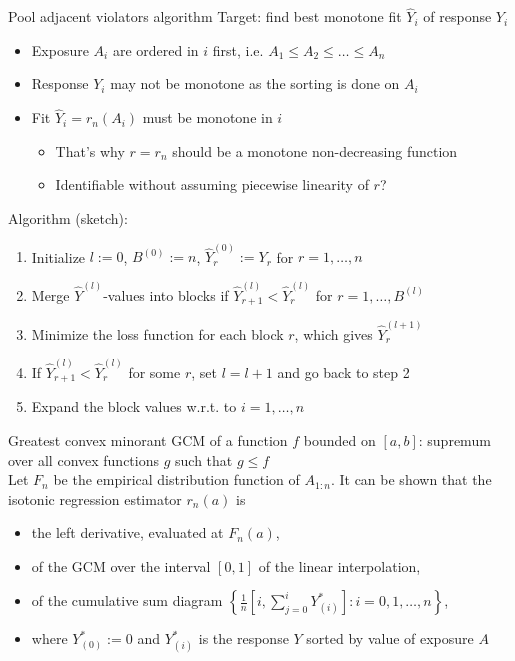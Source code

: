 \documentclass{beamer}
\newcommand{\f}[2]{\frac{#1}{#2}}
\newcommand{\vs}[1]{\vspace{#1 cm}}
\begin{document}
\begin{frame}{Pool adjacent violators algorithm}
  Target: find best monotone fit $\hat{Y}_i$ of response $Y_i$
  \begin{itemize}
    \item Exposure $A_i$ are ordered in $i$ first, i.e. $A_1 \le A_2 \le \dots \le A_n$
    \item Response $Y_i$ may not be monotone as the sorting is done on $A_i$
    \item Fit $\hat{Y}_i = r_n(A_i)$ must be monotone in $i$
    \begin{itemize}
      \item That's why $r=r_n$ should be a monotone non-decreasing function
      \item Identifiable without assuming piecewise linearity of $r$?
    \end{itemize}
  \end{itemize}
  Algorithm (sketch):
  \begin{enumerate}
    \item Initialize $l:=0$, $B^{(0)}:=n$, $\hat{Y}_r^{(0)} := Y_r$ for $r=1, \dots, n$
    \item Merge $\hat{Y}^{(l)}$-values into blocks if $\hat{Y}_{r+1}^{(l)} < \hat{Y}_r^{(l)}$ for $r=1, \dots, B^{(l)}$
    \item Minimize the loss function for each block $r$, which gives $\hat{Y}_r^{(l+1)}$
    \item If $\hat{Y}_{r+1}^{(l)} < \hat{Y}_r^{(l)}$ for some $r$, set $l = l+1$ and go back to step 2
    \item Expand the block values w.r.t. to $i=1, \dots, n$
  \end{enumerate}
\end{frame}

\begin{frame}{Greatest convex minorant}
  GCM of a function $f$ bounded on $[a,b]$: supremum over all convex functions $g$ such that $g \le f$ \\
  \vs{0.5}
  Let $F_n$ be the empirical distribution function of $A_{1:n}$. It can be shown that the isotonic regression estimator $r_n(a)$ is
  \begin{itemize}
    \item the left derivative, evaluated at $F_n(a)$,
    \item of the GCM over the interval $[0,1]$ of the linear interpolation,
    \item of the cumulative sum diagram $\left\{ \f{1}{n} \left[ i, \sum_{j=0}^i Y_{(i)}^* \right]: i=0,1,\dots,n \right\}$,
    \item where $Y_{(0)}^* := 0$ and $Y_{(i)}^*$ is the response $Y$ sorted by value of exposure $A$
  \end{itemize}
\end{frame}
\end{document}
